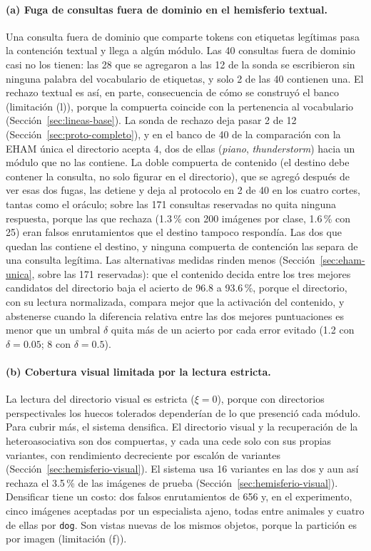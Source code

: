 \paragraph{(a) Fuga de consultas fuera de dominio en el hemisferio textual.}
Una consulta fuera de dominio que comparte tokens con etiquetas legítimas pasa la
contención textual y llega a algún módulo.
Las 40 consultas fuera de dominio casi no los tienen: las 28 que se agregaron a las 12
de la sonda se escribieron sin ninguna palabra del vocabulario de etiquetas, y solo 2 de
las 40 contienen una.
El rechazo textual es así, en parte, consecuencia de cómo se construyó el banco
(limitación (l)), porque la compuerta coincide con la pertenencia al vocabulario
(Sección~\ref{sec:lineas-base}).
La sonda de rechazo deja pasar 2 de 12 (Sección~\ref{sec:proto-completo}), y en el
banco de 40 de la comparación con la EHAM única el directorio acepta 4, dos de ellas
(\emph{piano}, \emph{thunderstorm}) hacia un módulo que no las contiene.
La doble compuerta de contenido (el destino debe contener la consulta, no solo figurar
en el directorio), que se agregó después de ver esas dos fugas, las detiene y deja al
protocolo en 2 de 40 en los cuatro cortes, tantas como el oráculo; sobre las 171
consultas reservadas no quita ninguna respuesta, porque las que rechaza (1.3\,\% con
200 imágenes por clase, 1.6\,\% con 25) eran falsos enrutamientos que el destino
tampoco respondía.
Las dos que quedan las contiene el destino, y ninguna compuerta de contención las
separa de una consulta legítima.
Las alternativas medidas rinden menos (Sección~\ref{sec:eham-unica}, sobre las 171
reservadas): que el contenido decida entre los tres mejores candidatos del directorio
baja el acierto de
96.8 a 93.6\,\%, porque el directorio, con su lectura normalizada, compara mejor que la
activación del contenido, y abstenerse cuando la diferencia relativa entre las dos
mejores puntuaciones es menor que un umbral $\delta$ quita más de un acierto por cada error
evitado (1.2 con $\delta = 0.05$; 8 con $\delta = 0.5$).

\paragraph{(b) Cobertura visual limitada por la lectura estricta.}
La lectura del directorio visual es estricta ($\xi = 0$), porque con directorios
perspectivales los huecos tolerados dependerían de lo que presenció cada módulo.
Para cubrir más, el sistema densifica.
El directorio visual y la recuperación de la heteroasociativa son dos compuertas, y
cada una cede solo con sus propias variantes, con rendimiento decreciente por escalón
de variantes (Sección~\ref{sec:hemisferio-visual}).
El sistema usa 16 variantes en las dos y aun así rechaza el 3.5\,\% de las imágenes de
prueba (Sección~\ref{sec:hemisferio-visual}).
Densificar tiene un costo: dos falsos enrutamientos de 656 y, en el experimento,
cinco imágenes aceptadas por un especialista ajeno, todas entre animales y cuatro de
ellas por \texttt{dog}.
Son vistas nuevas de los mismos objetos, porque la partición es por imagen
(limitación (f)).

